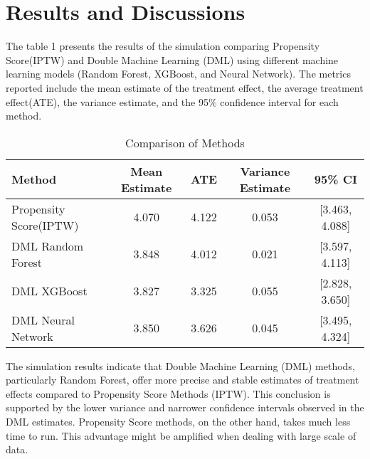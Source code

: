 \documentclass{article}
\begin{document}
\newpage
\section{Results and Discussions}
The table 1 presents the results of the simulation comparing Propensity Score(IPTW) and Double Machine Learning (DML) using different machine learning models (Random Forest, XGBoost, and Neural Network). The metrics reported include the mean estimate of the treatment effect, the average treatment effect(ATE), the variance estimate, and the 95\% confidence interval for each method.

\begin{table}[ht]
    \centering
    \begin{tabular}{|l|c|c|c|c|}
        \hline
        \textbf{Method} & \textbf{Mean Estimate} & \textbf{ATE} & \textbf{Variance Estimate} & \textbf{95\% CI} \\
        \hline
        Propensity Score(IPTW) & 4.070 & 4.122 & 0.053 & [3.463, 4.088] \\
        \hline
        DML Random Forest & 3.848 & 4.012 & 0.021 & [3.597, 4.113] \\
        \hline
        DML XGBoost & 3.827 & 3.325 & 0.055 & [2.828, 3.650] \\
        \hline
        DML Neural Network & 3.850 & 3.626 & 0.045 & [3.495, 4.324] \\
        \hline
    \end{tabular}
    \caption{Comparison of Methods}
    \label{tab:comparison}
\end{table}

The simulation results indicate that Double Machine Learning (DML) methods, particularly Random Forest, offer more precise and stable estimates of treatment effects compared to Propensity Score Methods (IPTW). This conclusion is supported by the lower variance and narrower confidence intervals observed in the DML estimates. Propensity Score methods, on the other hand, takes much less time to run. This advantage might be amplified when dealing with large scale of data.
\end{document}
